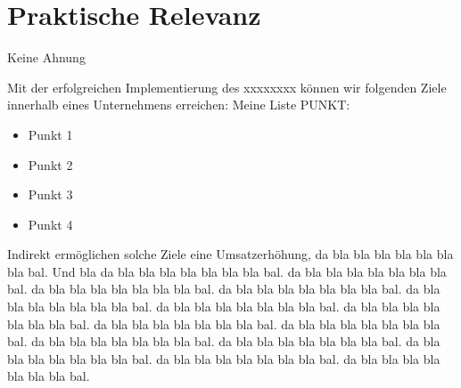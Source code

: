 \section{Praktische Relevanz}

Keine Ahnung



Mit der erfolgreichen Implementierung des xxxxxxxx können wir folgenden Ziele innerhalb eines Unternehmens erreichen:
Meine Liste PUNKT:
\begin{itemize}
    \item Punkt 1
    \item Punkt 2
    \item Punkt 3
    \item Punkt 4
\end{itemize}

Indirekt ermöglichen solche Ziele eine Umsatzerhöhung, da bla bla bla bla bla bla bla bal. 
Und bla da bla bla bla bla bla bla bla bal. da bla bla bla bla bla bla bla bal. da bla bla bla bla bla bla bla bal. 
da bla bla bla bla bla bla bla bal. da bla bla bla bla bla bla bla bal. da bla bla bla bla bla bla bla bal. 
da bla bla bla bla bla bla bla bal. da bla bla bla bla bla bla bla bal. da bla bla bla bla bla bla bla bal. 
da bla bla bla bla bla bla bla bal. da bla bla bla bla bla bla bla bal. da bla bla bla bla bla bla bla bal. 
da bla bla bla bla bla bla bla bal. da bla bla bla bla bla bla bla bal. 